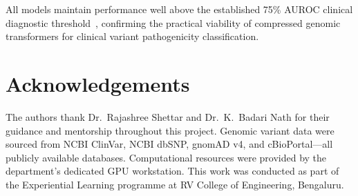 \documentclass[journal]{IEEEtran}
\begin{document}
All models maintain performance well above the established
75\% AUROC clinical diagnostic threshold~\cite{Abad-Grau2016},
confirming the practical viability of compressed genomic
transformers for clinical variant pathogenicity classification.


\section*{Acknowledgements}
The authors thank Dr.~Rajashree Shettar and Dr.~K.~Badari
Nath for their guidance and mentorship throughout this project.
Genomic variant data were sourced from NCBI ClinVar, NCBI
dbSNP, gnomAD v4, and cBioPortal---all publicly available
databases.
Computational resources were provided by the department's
dedicated GPU workstation.
This work was conducted as part of the Experiential Learning
programme at RV College of Engineering, Bengaluru.
\end{document}
